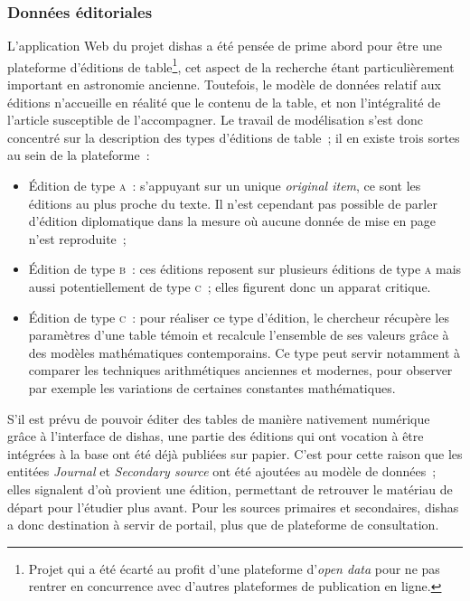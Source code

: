 \documentclass[a4paper,12pt,twoside]{book}
\newcommand{\eng}{\emph}
\newcommand{\oi}{\eng{original item}\xspace}
\newcommand{\dishas}{\gls{dishas}\xspace}
\begin{document}
			\subsubsection{Données éditoriales}
L'application Web du projet \dishas a été pensée de prime abord pour être une plateforme d'éditions de table\footnote{Projet qui a été écarté au profit d'une plateforme d'\eng{open data} pour ne pas rentrer en concurrence avec d'autres plateformes de publication en ligne.}, cet aspect de la recherche étant particulièrement important en astronomie ancienne. Toutefois, le modèle de données relatif aux éditions n'accueille en réalité que le contenu de la table, et non l'intégralité de l'article susceptible de l'accompagner. Le travail de modélisation s'est donc concentré sur la description des types d'éditions de table~; il en existe trois sortes au sein de la plateforme~:
\begin{itemize}
	\item Édition de type \textsc{a}~: s'appuyant sur un unique \oi, ce sont les éditions au plus proche du texte. Il n'est cependant pas possible de parler d'édition diplomatique dans la mesure où aucune donnée de mise en page n'est reproduite~;
	\item Édition de type \textsc{b}~: ces éditions reposent sur plusieurs éditions de type \textsc{a} mais aussi potentiellement de type \textsc{c}~; elles figurent donc un apparat critique.
	\item Édition de type \textsc{c}~: pour réaliser ce type d'édition, le chercheur récupère les paramètres d'une table témoin et recalcule l'ensemble de ses valeurs grâce à des modèles mathématiques contemporains. Ce type peut servir notamment à comparer les techniques arithmétiques anciennes et modernes, pour observer par exemple les variations de certaines constantes mathématiques.
\end{itemize}
S'il est prévu de pouvoir éditer des tables de manière nativement numérique grâce à l'interface de \dishas, une partie des éditions qui ont vocation à être intégrées à la base ont été déjà publiées sur papier. C'est pour cette raison que les entitées \eng{Journal} et \eng{Secondary source} ont été ajoutées au modèle de données~; elles signalent d'où provient une édition, permettant de retrouver le matériau de départ pour l'étudier plus avant. Pour les sources primaires et secondaires, \dishas a donc destination à servir de portail, plus que de plateforme de consultation.
\end{document}
